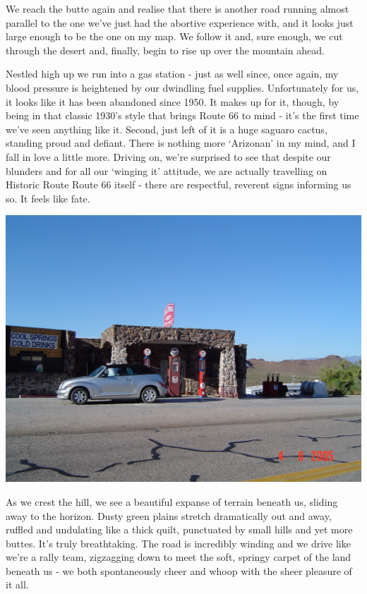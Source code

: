 \documentclass[a5paper,titlepage,11pt,draft]{book}
\begin{document}
We reach the butte again and realise that there is another road running almost parallel to the one we've just had the abortive experience with, and it looks just large enough to be the one on my map.  We follow it and, sure enough, we cut through the desert and, finally, begin to rise up over the mountain ahead.

Nestled high up we run into a gas station - just as well since, once again, my blood pressure is heightened by our dwindling fuel supplies.  Unfortunately for us, it looks like it has been abandoned since 1950.  It makes up for it, though, by being in that classic 1930's style that brings Route 66 to mind - it's the first time we've seen anything like it.  Second, just left of it is a huge saguaro cactus, standing proud and defiant.  There is nothing more `Arizonan' in my mind, and I fall in love a little more.  Driving on, we're surprised to see that despite our blunders and for all our `winging it' attitude, we are actually travelling on Historic Route Route 66 itself - there are respectful, reverent signs informing us so.  It feels like fate.

\begin{center}\includegraphics[width=\textwidth]{gfx/DSC00700}\end{center}

As we crest the hill, we see a beautiful expanse of terrain beneath us, sliding away to the horizon.  Dusty green plains stretch dramatically out and away, ruffled and undulating like a thick quilt, punctuated by small hills and yet more buttes.  It's truly breathtaking.  The road is incredibly winding and we drive like we're a rally team, zigzagging down to meet the soft, springy carpet of the land beneath us - we both spontaneously cheer and whoop with the sheer pleasure of it all.
\end{document}
